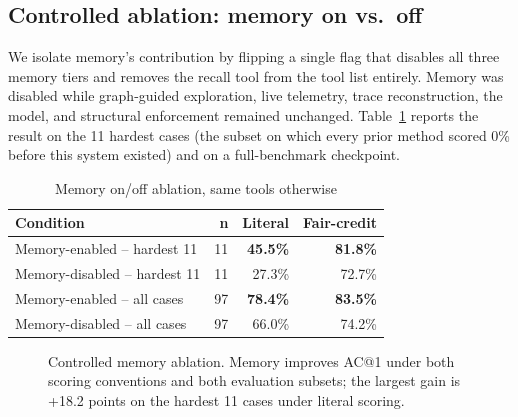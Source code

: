 \documentclass[conference]{IEEEtran}
\begin{document}
\subsection{Controlled ablation: memory on vs.\ off}

We isolate memory's contribution by flipping a single flag that disables all three memory tiers and removes the
recall tool from the tool list entirely. Memory was disabled while graph-guided exploration, live telemetry,
trace reconstruction, the model, and structural enforcement remained unchanged. Table~\ref{tab:ablation} reports
the result on the 11 hardest cases (the subset on which every prior method scored 0\% before this system
existed) and on a full-benchmark checkpoint.

\begin{table}[t]
\caption{Memory on/off ablation, same tools otherwise}
\label{tab:ablation}
\centering
\begin{tabular}{@{}lrrr@{}}
\toprule
\textbf{Condition} & \textbf{n} & \textbf{Literal} & \textbf{Fair-credit} \\
\midrule
Memory-enabled -- hardest 11 & 11 & \textbf{45.5\%} & \textbf{81.8\%} \\
Memory-disabled -- hardest 11 & 11 & 27.3\% & 72.7\% \\
Memory-enabled -- all cases & 97 & \textbf{78.4\%} & \textbf{83.5\%} \\
Memory-disabled -- all cases & 97 & 66.0\% & 74.2\% \\
\bottomrule
\end{tabular}
\end{table}

\begin{figure}[t]
\centering
{}
\caption{Controlled memory ablation. Memory improves AC@1 under both scoring conventions and both evaluation
subsets; the largest gain is +18.2 points on the hardest 11 cases under literal scoring.}
\label{fig:ablation}
\end{figure}
\end{document}
